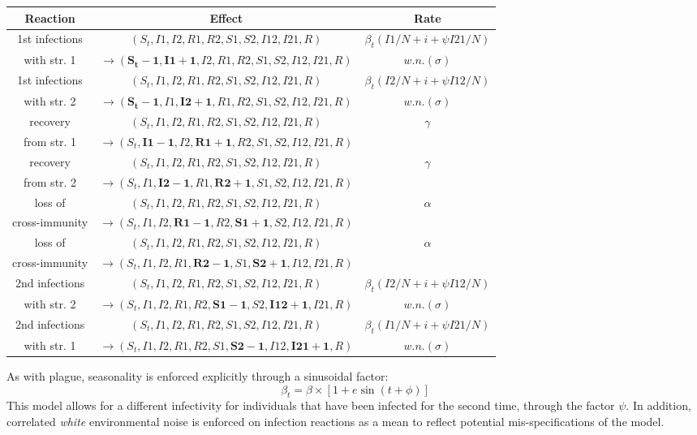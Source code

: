 \documentclass[a4paper,11pt,titlepage]{article}
\theoremstyle{plain} %
\begin{document}
\begin{center}
 \begin{adjustwidth}{-0.35in}{-0.35in}
\begin{tabular}{ccc}
\textbf{Reaction} & \textbf{Effect}   & \textbf{Rate}  \tabularnewline
\hline
1st infections  & $(S_t,I1,I2,R1,R2,S1,S2,I12,I21,R)$ & $\beta_t(I1/N+i+\psi I21/N)$  \tabularnewline
with str. 1&$\rightarrow (\boldsymbol{S_t-1},\boldsymbol{I1+1},I2,R1,R2,S1,S2,I12,I21,R)$ &  $w.n.(\sigma)$ \tabularnewline[0.5cm]
1st infections  & $(S_t,I1,I2,R1,R2,S1,S2,I12,I21,R)$ & $\beta_t(I2/N+i+\psi I12/N)$  \tabularnewline
with str. 2&$\rightarrow (\boldsymbol{S_t-1},I1,\boldsymbol{I2+1},R1,R2,S1,S2,I12,I21,R)$ &  $w.n.(\sigma)$ \tabularnewline[0.5cm]
recovery & $(S_t,I1,I2,R1,R2,S1,S2,I12,I21,R)$ & $\gamma$  \tabularnewline
from str. 1&$\rightarrow (S_t,\boldsymbol{I1-1},I2,\boldsymbol{R1+1},R2,S1,S2,I12,I21,R)$ &  \tabularnewline[0.5cm]
recovery & $(S_t,I1,I2,R1,R2,S1,S2,I12,I21,R)$ & $\gamma$  \tabularnewline
from str. 2&$\rightarrow (S_t,I1,\boldsymbol{I2-1},R1,\boldsymbol{R2+1},S1,S2,I12,I21,R)$ &  \tabularnewline[0.5cm]
loss of & $(S_t,I1,I2,R1,R2,S1,S2,I12,I21,R)$ & $\alpha$  \tabularnewline
cross-immunity&$\rightarrow (S_t,I1,I2,\boldsymbol{R1-1},R2,\boldsymbol{S1+1},S2,I12,I21,R)$ &  \tabularnewline[0.5cm]
loss of  & $(S_t,I1,I2,R1,R2,S1,S2,I12,I21,R)$ & $\alpha$  \tabularnewline
cross-immunity&$\rightarrow (S_t,I1,I2,R1,\boldsymbol{R2-1},S1,\boldsymbol{S2+1},I12,I21,R)$ &  \tabularnewline[0.5cm]
2nd infections  & $(S_t,I1,I2,R1,R2,S1,S2,I12,I21,R)$ & $\beta_t(I2/N+i+\psi I12/N)$  \tabularnewline
with str. 2&$\rightarrow (S_t,I1,I2,R1,R2,\boldsymbol{S1-1},S2,\boldsymbol{I12+1},I21,R)$ & $w.n.(\sigma)$ \tabularnewline[0.5cm]
2nd infections  & $(S_t,I1,I2,R1,R2,S1,S2,I12,I21,R)$ & $\beta_t(I1/N+i+\psi I21/N)$  \tabularnewline
with str. 1&$\rightarrow (S_t,I1,I2,R1,R2,S1,\boldsymbol{S2-1},I12,\boldsymbol{I21+1},R)$ & $w.n.(\sigma)$  \tabularnewline[0.5cm]
\end{tabular}
\end{adjustwidth}
\end{center}

 As with plague, seasonality is enforced explicitly through a sinusoidal factor: 
 $$\beta_t = \beta \times[1+e\sin(t+\phi)]$$ 
 This model allows for a different infectivity for individuals that have been infected for the second time, through the factor $\psi$. In addition, correlated \emph{white} environmental noise is enforced on infection reactions as a mean to reflect potential mis-specifications of the model.
\end{document}
